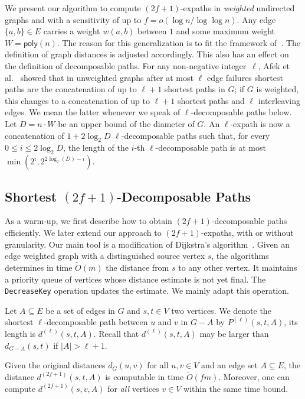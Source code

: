 \documentclass{article}\usepackage[a4paper,margin=20mm]{geometry}
\newcommand*{\Otilde}{\widetilde{O}}
\newcommand*{\poly}{\textsf{poly}}
\renewcommand{\le}{\leqslant}
\begin{document}
We present our algorithm to compute $(2f{+}1)$-expaths in \emph{weighted} undirected graphs
and with a sensitivity of up to $f = o(\log n/\log\log n)$.
Any edge $\{a,b\} \in E$ carries a weight $w(a,b)$ between $1$ and some maximum weight $W = \poly(n)$.
The reason for this generalization is to fit the framework of~\cite{ChCoFiKa17}.
The definition of graph distances is adjusted accordingly.
This also has an effect on the definition of decomposable paths.
For any non-negative integer~$\ell$, 
Afek et al.~\cite[Theorem~1]{Afek02RestorationbyPathConcatenation_journal}
showed that in unweighted graphs after at most $\ell$ edge failures
shortest paths are the concatenation of up to $\ell+1$ shortest paths in $G$;
if $G$ is weighted, this changes to a
concatenation of up to $\ell+1$ shortest paths and $\ell$ interleaving edges.
We mean the latter whenever we speak of $\ell$-decomposable paths below.
Let $D = n \cdot W$ be an upper bound of the diameter of $G$.
An $\ell$-expath is now a concatenation of $1+2\log_2 D$ $\ell$-decomposable paths
such that, for every $0 \le i \le 2\log_2 D$,
the length of the $i$-th \mbox{$\ell$-decomposable} path is at most $\min(2^i, 2^{2\log_2(D) - i})$.


\subsection{Shortest \texorpdfstring{$(2f{+}1)$}{(2f+1)}-Decomposable Paths}
\label{subsec:improved_preproc_decomposable}

As a warm-up, we first describe how to obtain 
$(2f{+}1)$-decomposable paths efficiently.
We later extend our approach to $(2f{+}1)$-expaths,
with or without granularity.
Our main tool is a modification of Dijkstra's algorithm~\cite[Chapter 22.3]{clrs}.
Given an edge weighted graph with a distinguished source vertex $s$,
the algorithms determines in time $\Otilde(m)$ the distance from $s$ to any other vertex.
It maintains a priority queue of vertices whose distance estimate
is not yet final.
The \texttt{DecreaseKey} operation updates the estimate.
We mainly adapt this operation.


Let $A \subseteq E$ be a set of edges in $G$ and $s,t \in V$ two vertices.
We denote the shortest $\ell$-decomposable path between $u$ and $v$ in $G-A$ by $P^{(\ell)}(s,t,A)$,
its length is $d^{(\ell)}(s,t,A)$.
Recall that $d^{(\ell)}(s,t,A)$ may be larger than $d_{G-A}(s,t)$ if $|A| > \ell + 1$.

\begin{lemma}
\label{lem:f-decomposable}
Given the original distances $d_G(u,v)$ for all $u,v \in V$
and an edge set $A \subseteq E$, 
the distance $d^{(2f+1)}(s, t, A)$ is computable in time $\Otilde(fm)$.
Moreover, one can compute $d^{(2f+1)}(s, v, A)$
for \emph{all} vertices $v \in V$ within the same time bound.
\end{lemma}
\end{document}
